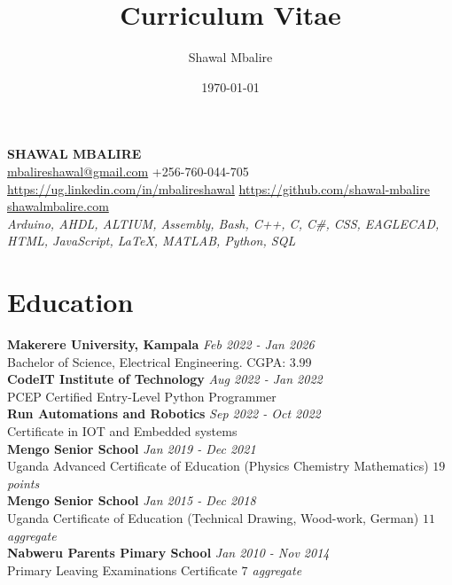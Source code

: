 \documentclass[a4paper,twocolumn]{article}
\title{Curriculum Vitae}
\author{Shawal Mbalire}
\date{\today}
\begin{document}
    {\centering
        \LARGE{\bf SHAWAL MBALIRE} \\
        {\small
	        \url{mbalireshawal@gmail.com}\hspace{1em}
	        +256-760-044-705\hspace{2em}
	        \url{https://ug.linkedin.com/in/mbalireshawal}
	        \url{https://github.com/shawal-mbalire} \hspace{2em}
	        \url{shawalmbalire.com}\\
	        {\it Arduino, AHDL, ALTIUM, Assembly, Bash, C++, C,  C\#, CSS, EAGLECAD, HTML,  JavaScript, LaTeX,  MATLAB, Python, SQL}
    	}
    }

    
    
    

        \section*{\bf Education}
        {\bf Makerere University, Kampala}
        \hfil{\em Feb 2022 - Jan 2026}\\
        Bachelor of Science, Electrical Engineering.
        \hfil CGPA: 3.99\\
        {\bf CodeIT Institute of Technology}
        \hfil{\em Aug 2022 - Jan 2022}\\
        PCEP Certified Entry-Level Python Programmer\\
        {\bf Run Automations and Robotics}
        \hfil{\em Sep 2022 - Oct 2022}\\
        Certificate in IOT and Embedded systems\\
        {\bf Mengo Senior School}
        \hfil{\em Jan 2019 - Dec 2021}\\
        Uganda Advanced Certificate of Education (Physics Chemistry Mathematics)
        \hfil{\em $19$ points}\\
        {\bf Mengo Senior School}
        \hfil{\em Jan 2015 - Dec 2018}\\
        Uganda Certificate of Education (Technical Drawing, Wood-work, German)
        \hfil{\em $11$ aggregate}\\
        {\bf Nabweru Parents Pimary School}
        \hfil{\em Jan 2010 - Nov 2014}\\
        Primary Leaving Examinations Certificate
		\hfil{\em $7$ aggregate}
\end{document}
